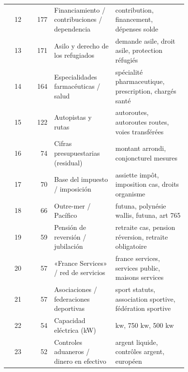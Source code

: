 {\begin{longtable}{@{}r r >{\raggedright\arraybackslash}p{0.34\linewidth} >{\raggedright\arraybackslash}p{0.40\linewidth}@{}}
12 & 177 & Financiamiento / contribuciones / dependencia & 000 contribution, financement, dépenses solde \\
13 & 171 & Asilo y derecho de los refugiados & demande asile, droit asile, protection réfugiés \\
14 & 164 & Especialidades farmacéuticas / salud & spécialité pharmaceutique, prescription, chargés santé \\
15 & 122 & Autopistas y rutas & autoroutes, autoroutes routes, voies transférées \\
16 & 74 & Cifras presupuestarias (residual) & montant arrondi, conjoncturel mesures \\
17 & 70 & Base del impuesto / imposición & assiette impôt, imposition cas, droits organisme \\
18 & 66 & Outre-mer / Pacífico & futuna, polynésie wallis, futuna, art 765 \\
19 & 59 & Pensión de reversión / jubilación & retraite cas, pension réversion, retraite obligatoire \\
20 & 57 & «France Services» / red de servicios & france services, services public, maisons services \\
21 & 57 & Asociaciones / federaciones deportivas & sport statuts, association sportive, fédération sportive \\
22 & 54 & Capacidad eléctrica (kW) & 000 kw, 750 kw, 500 kw \\
23 & 52 & Controles aduaneros / dinero en efectivo & argent liquide, contrôles argent, européen \\
\end{longtable}
}

